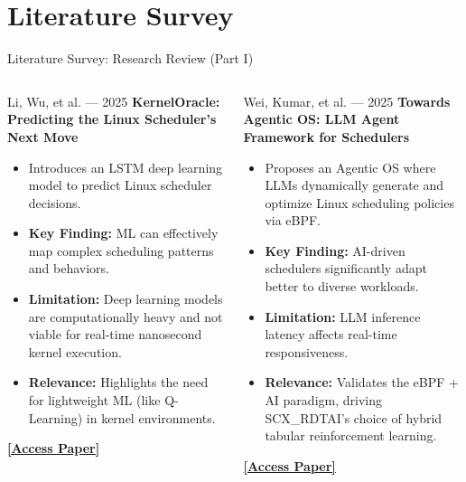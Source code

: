 \documentclass[aspectratio=169]{beamer}
\begin{document}
\section{Literature Survey}

\begin{frame}{Literature Survey: Research Review (Part I)}
  \footnotesize
  \begin{columns}[T]
      \begin{block}{\color{white}Li, Wu, et al. — 2025}
        \textbf{KernelOracle: Predicting the Linux Scheduler's Next Move}
        \begin{itemize}\scriptsize\itemsep3pt
          \item Introduces an LSTM deep learning model to predict Linux scheduler decisions.
          \item \textbf{Key Finding:} ML can effectively map complex scheduling patterns and behaviors.
          \item \textbf{Limitation:} Deep learning models are computationally heavy and not viable for real-time nanosecond kernel execution.
          \item \textbf{Relevance:} Highlights the need for lightweight ML (like Q-Learning) in kernel environments.
        \end{itemize}
        \href{https://arxiv.org/pdf/2505.15213.pdf}{\textcolor{primary}{\textbf{[Access Paper]}}}
      \end{block}
      \begin{block}{\color{white}Wei, Kumar, et al. — 2025}
        \textbf{Towards Agentic OS: LLM Agent Framework for Schedulers}
        \begin{itemize}\scriptsize\itemsep3pt
          \item Proposes an Agentic OS where LLMs dynamically generate and optimize Linux scheduling policies via eBPF.
          \item \textbf{Key Finding:} AI-driven schedulers significantly adapt better to diverse workloads.
          \item \textbf{Limitation:} LLM inference latency affects real-time responsiveness.
          \item \textbf{Relevance:} Validates the eBPF + AI paradigm, driving SCX\_RDTAI's choice of hybrid tabular reinforcement learning.
        \end{itemize}
        \href{https://arxiv.org/pdf/2509.01245.pdf}{\textcolor{primary}{\textbf{[Access Paper]}}}
      \end{block}
  \end{columns}
\end{frame}
\end{document}
